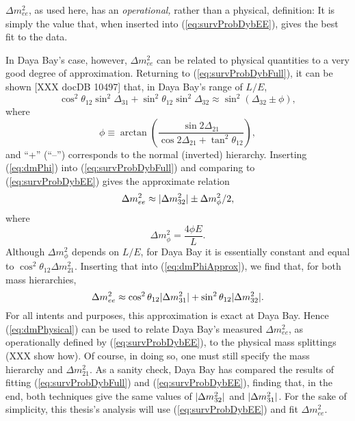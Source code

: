 \documentclass[../thesis.tex]{subfiles}
\begin{document}
\(\Delta m^2_{ee}\), as used here, has an \emph{operational,} rather than a physical, definition: It is simply the value that, when inserted into (\ref{eq:survProbDybEE}), gives the best fit to the data.
%
\begin{comment}
  Note that, if Daya Bay only measured antineutrinos at a single $L/E$, we could instead have made a truly physical definition of $\Delta m^2_{ee}$ by declaring that \[ \sin^2 \Delta_{ee} \equiv \cos^2\theta_{12} \sin^2 \Delta_{31} + \sin^2\theta_{12} \sin^2 \Delta_{32}. \] However, the righthand side of this definition depends on $L/E$, so unless this dependence is shown to be negligible, it cannot be used in broadband analyses such as Daya Bay's.
\end{comment}
%
In Daya Bay's case, however, \(\Delta m^2_{ee}\) can be related to physical quantities to a very good degree of approximation. Returning to (\ref{eq:survProbDybFull}), it can be shown [XXX docDB 10497] that, in Daya Bay's range of $L/E$,
\begin{equation}
  \label{eq:dmPhi}
  \cos^2\theta_{12} \sin^2\Delta_{31} + \sin^2\theta_{12}\sin^2\Delta_{32}
  \approx \sin^2 (\Delta_{32} \pm \phi),
\end{equation}
where
\begin{equation*}
  \phi \equiv \arctan\left( \frac{\sin2\Delta_{21}}{\cos2\Delta_{21}+ \tan^2
      \theta_{12}} \right),
\end{equation*}
and ``+'' (``--'') corresponds to the normal (inverted) hierarchy. Inserting (\ref{eq:dmPhi}) into (\ref{eq:survProbDybFull}) and comparing to (\ref{eq:survProbDybEE}) gives the approximate relation
\begin{equation}
  \label{eq:dmPhiApprox}
  \Delta m^2_{ee} \approx \lvert \Delta m^2_{32}\rvert \pm \Delta m^2_\phi/2,
\end{equation}
where
\begin{equation*}
  \Delta m^2_\phi = \frac{4\phi E}{L}.
\end{equation*}
Although $\Delta m^2_\phi$ depends on $L/E$, for Daya Bay it is essentially constant and equal to \(\cos^2\theta_{12}\Delta m^2_{21}\). Inserting that into (\ref{eq:dmPhiApprox}), we find that, for both mass hierarchies,
\begin{equation}
  \label{eq:dmPhysical}
  \Delta m^2_{ee} \approx \cos^2\theta_{12}\lvert \Delta m^2_{31}\rvert + \sin^2\theta_{12}\lvert \Delta m^2_{32}\rvert.
\end{equation}
For all intents and purposes, this approximation is exact at Daya Bay. Hence (\ref{eq:dmPhysical}) can be used to relate Daya Bay's measured \(\Delta m^2_{ee}\), as operationally defined by (\ref{eq:survProbDybEE}), to the physical mass splittings (XXX show how). Of course, in doing so, one must still specify the mass hierarchy and \(\Delta m^2_{21}.\) As a sanity check, Daya Bay has compared the results of fitting (\ref{eq:survProbDybFull}) and (\ref{eq:survProbDybEE}), finding that, in the end, both techniques give the same values of \(\lvert \Delta m^2_{32}\rvert\) and \(\lvert \Delta m^2_{31}\rvert\). For the sake of simplicity, this thesis's analysis will use (\ref{eq:survProbDybEE}) and fit \(\Delta m^2_{ee}\).
\end{document}
